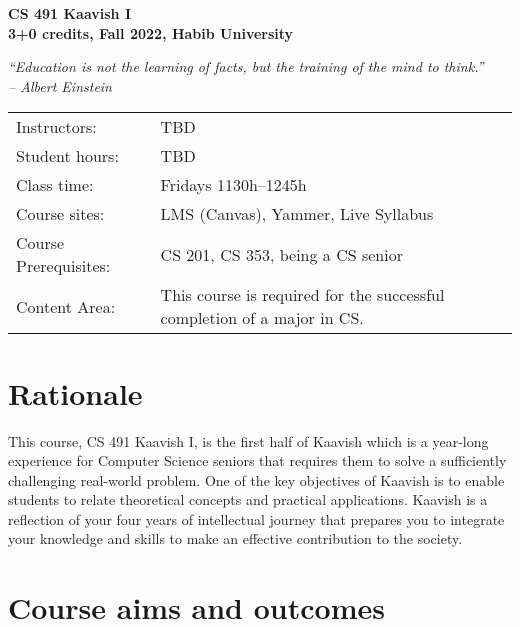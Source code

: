 \documentclass[a4paper]{article}
\newcommand{\new}[1]{{#1}}
\begin{document}
\begin{center}
  {\bfseries {\huge CS 491 Kaavish I}\\\bigskip
    {\large 3+0 credits, Fall 2022, Habib University}}\\\medskip

\textit{``Education is not the learning of facts, but the training of the mind to think.''\\
  -- Albert Einstein}
\end{center}

\noindent
\begin{tabularx}{1.0\linewidth}{lX}
  Instructors: & TBD\\
  Student hours: & TBD\\
  Class time: & Fridays 1130h--1245h\\
  Course sites: & LMS (Canvas), Yammer, Live Syllabus\\
  Course Prerequisites: & CS 201, CS 353, being a CS senior\\
  Content Area: & This course is required for the successful completion of a major in CS.
\end{tabularx}
\medskip

\section{Rationale}
\new{This course, CS 491 Kaavish I, is the first half of Kaavish which is} a year-long experience for Computer Science seniors that requires them to solve a sufficiently challenging real-world problem. One of the key objectives of Kaavish is to enable students to relate theoretical concepts and practical applications. Kaavish is a reflection of your four years of intellectual journey that prepares you to integrate your knowledge and skills to make an effective contribution to the society.

\section{Course aims and outcomes}
\end{document}
